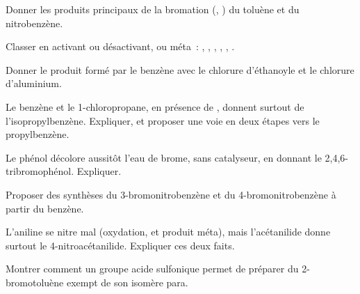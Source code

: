 \begin{exercise}[$\star$]\label{exo:b2:aromatic-substitution:2}
Donner les produits principaux de la bromation (, ) du toluène et du
nitrobenzène.
\end{exercise}

\begin{exercise}[$\star$]\label{exo:b2:aromatic-substitution:3}
Classer en activant ou désactivant,  ou méta~: , , ,
, , .
\end{exercise}

\begin{exercise}[$\star$]\label{exo:b2:aromatic-substitution:4}
Donner le produit formé par le benzène avec le chlorure d'éthanoyle et le chlorure d'aluminium.
\end{exercise}

\begin{exercise}[$\star\star$]\label{exo:b2:aromatic-substitution:5}
Le benzène et le 1-chloropropane, en présence de , donnent surtout de
l'isopropylbenzène. Expliquer, et proposer une voie en deux étapes vers le propylbenzène.
\end{exercise}

\begin{exercise}[$\star\star$]\label{exo:b2:aromatic-substitution:6}
Le phénol décolore aussitôt l'eau de brome, sans catalyseur, en donnant le
2,4,6-tribromophénol. Expliquer.
\end{exercise}

\begin{exercise}[$\star\star$]\label{exo:b2:aromatic-substitution:7}
Proposer des synthèses du 3-bromonitrobenzène et du 4-bromonitrobenzène à partir du benzène.
\end{exercise}

\begin{exercise}[$\star\star$]\label{exo:b2:aromatic-substitution:8}
L'aniline se nitre mal (oxydation, et produit méta), mais l'acétanilide donne surtout le
4-nitroacétanilide. Expliquer ces deux faits.
\end{exercise}

\begin{exercise}[$\star\star$]\label{exo:b2:aromatic-substitution:9}
Montrer comment un groupe acide sulfonique permet de préparer du 2-bromotoluène exempt de son isomère para.
\end{exercise}

